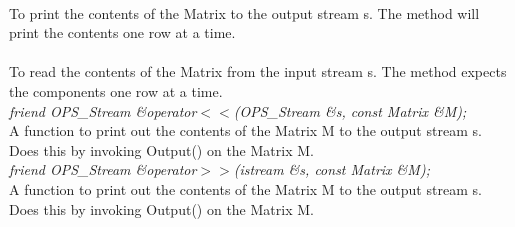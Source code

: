  \\
To print the contents of the Matrix to the output stream \p s. The
method will print the contents one row at a time. \\ 

 \\
To read the contents of the Matrix from the input stream \p s. The method expects the components one row at a time. \\

{\em friend OPS_Stream \&operator$<<$(OPS_Stream \&s, const Matrix \&M);} \\
A function to print out the contents of the Matrix \p M to the
output stream \p s. Does this by invoking Output() on the
Matrix \p M.\\ 

{\em friend OPS_Stream \&operator$>>$(istream \&s, const Matrix \&M);} \\
A function to print out the contents of the Matrix \p M to the
output stream \p s. Does this by invoking Output() on the
Matrix \p M.\\ 

